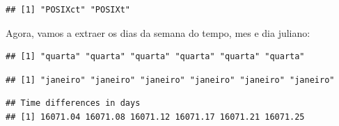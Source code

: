 \documentclass[]{book}
\newenvironment{Shaded}{\begin{snugshade}}{\end{snugshade}}
\newcommand{\KeywordTok}[1]{\textcolor[rgb]{0.13,0.29,0.53}{\textbf{#1}}}
\newcommand{\StringTok}[1]{\textcolor[rgb]{0.31,0.60,0.02}{#1}}
\newcommand{\OperatorTok}[1]{\textcolor[rgb]{0.81,0.36,0.00}{\textbf{#1}}}
\newcommand{\NormalTok}[1]{#1}
\begin{document}
\begin{Shaded}
\end{Shaded}

\begin{verbatim}
## [1] "POSIXct" "POSIXt"
\end{verbatim}

Agora, vamos a extraer os dias da semana do tempo, mes e dia juliano:

\begin{Shaded}
\end{Shaded}

\begin{verbatim}
## [1] "quarta" "quarta" "quarta" "quarta" "quarta" "quarta"
\end{verbatim}

\begin{Shaded}
\end{Shaded}

\begin{verbatim}
## [1] "janeiro" "janeiro" "janeiro" "janeiro" "janeiro" "janeiro"
\end{verbatim}

\begin{Shaded}
\end{Shaded}

\begin{verbatim}
## Time differences in days
## [1] 16071.04 16071.08 16071.12 16071.17 16071.21 16071.25
\end{verbatim}
\end{document}
